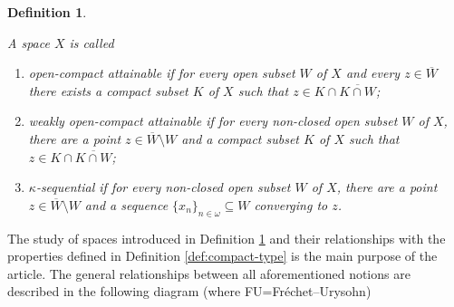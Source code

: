 \documentclass[preprint,11pt]{elsarticle}
\newtheorem{definition}[theorem]{Definition}
\numberwithin{equation}{section}
\numberwithin{theorem}{section}
\newcommand{\w}{\omega}
\newcommand{\IR}{\mathbb{R}}
\newcommand{\KK}{\mathcal{K}}
\newcommand{\CC}{C_k}
\newcommand{\SM}{{\setminus}}
\begin{document}


\begin{definition} \label{def:oca} {\em
A space $X$ is called
\begin{enumerate}
\item[$\bullet$] {\em open-compact attainable}  if for every open subset $W$ of $X$ and every $z\in \overline{W}$ there exists a compact subset $K$ of $X$ such that $z\in K\cap \overline{K\cap W}$;
\item[$\bullet$] {\em weakly open-compact attainable}  if for every non-closed open subset $W$ of $X$, there are a point $z\in \overline{W}\SM W$ and a compact subset $K$ of $X$ such that $z\in K\cap \overline{K\cap W}$;
\item[$\bullet$] {\em $\kappa$-sequential}  if for every non-closed open subset $W$ of $X$, there are a point $z\in \overline{W}\SM W$ and a sequence $\{x_n\}_{n\in\w}\subseteq W$ converging to $z$.
\end{enumerate}  }
\end{definition}

The study of spaces introduced in Definition \ref{def:oca}  and their relationships with the properties defined in Definition \ref{def:compact-type} is the main purpose of the article. The general relationships between all aforementioned notions are described in the following diagram (where FU=Fr\'{e}chet--Urysohn)
\end{document}

